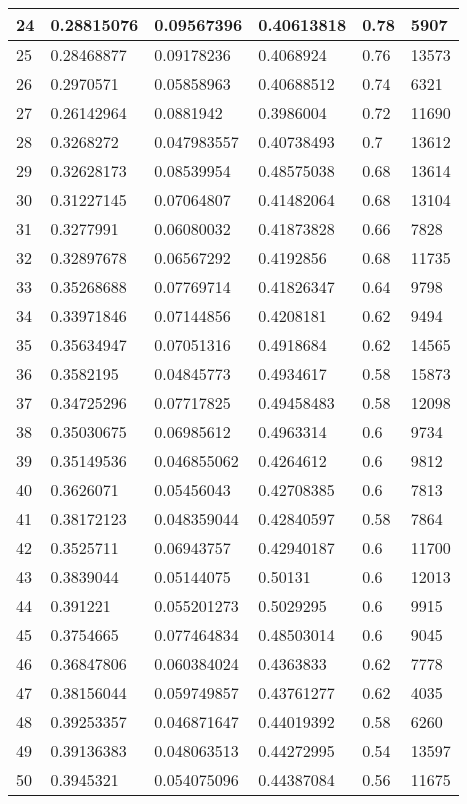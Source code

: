 \begin{longtable}{|l|l|l|l|l|l|}
24 & 0.28815076 & 0.09567396 & 0.40613818 & 0.78 & 5907 \\ \hline 
25 & 0.28468877 & 0.09178236 & 0.4068924 & 0.76 & 13573 \\ \hline 
26 & 0.2970571 & 0.05858963 & 0.40688512 & 0.74 & 6321 \\ \hline 
27 & 0.26142964 & 0.0881942 & 0.3986004 & 0.72 & 11690 \\ \hline 
28 & 0.3268272 & 0.047983557 & 0.40738493 & 0.7 & 13612 \\ \hline 
29 & 0.32628173 & 0.08539954 & 0.48575038 & 0.68 & 13614 \\ \hline 
30 & 0.31227145 & 0.07064807 & 0.41482064 & 0.68 & 13104 \\ \hline 
31 & 0.3277991 & 0.06080032 & 0.41873828 & 0.66 & 7828 \\ \hline 
32 & 0.32897678 & 0.06567292 & 0.4192856 & 0.68 & 11735 \\ \hline 
33 & 0.35268688 & 0.07769714 & 0.41826347 & 0.64 & 9798 \\ \hline 
34 & 0.33971846 & 0.07144856 & 0.4208181 & 0.62 & 9494 \\ \hline 
35 & 0.35634947 & 0.07051316 & 0.4918684 & 0.62 & 14565 \\ \hline 
36 & 0.3582195 & 0.04845773 & 0.4934617 & 0.58 & 15873 \\ \hline 
37 & 0.34725296 & 0.07717825 & 0.49458483 & 0.58 & 12098 \\ \hline 
38 & 0.35030675 & 0.06985612 & 0.4963314 & 0.6 & 9734 \\ \hline 
39 & 0.35149536 & 0.046855062 & 0.4264612 & 0.6 & 9812 \\ \hline 
40 & 0.3626071 & 0.05456043 & 0.42708385 & 0.6 & 7813 \\ \hline 
41 & 0.38172123 & 0.048359044 & 0.42840597 & 0.58 & 7864 \\ \hline 
42 & 0.3525711 & 0.06943757 & 0.42940187 & 0.6 & 11700 \\ \hline 
43 & 0.3839044 & 0.05144075 & 0.50131 & 0.6 & 12013 \\ \hline 
44 & 0.391221 & 0.055201273 & 0.5029295 & 0.6 & 9915 \\ \hline 
45 & 0.3754665 & 0.077464834 & 0.48503014 & 0.6 & 9045 \\ \hline 
46 & 0.36847806 & 0.060384024 & 0.4363833 & 0.62 & 7778 \\ \hline 
47 & 0.38156044 & 0.059749857 & 0.43761277 & 0.62 & 4035 \\ \hline 
48 & 0.39253357 & 0.046871647 & 0.44019392 & 0.58 & 6260 \\ \hline 
49 & 0.39136383 & 0.048063513 & 0.44272995 & 0.54 & 13597 \\ \hline 
50 & 0.3945321 & 0.054075096 & 0.44387084 & 0.56 & 11675 \\ \hline 
\end{longtable}